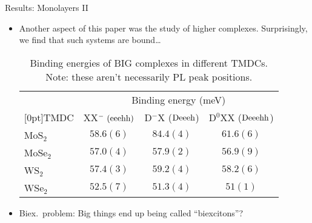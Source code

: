 \documentclass[12pt, pdf, hyperref={draft}, usenames, dvipsnames]{beamer}
\begin{document}
\begin{frame}{Results: Monolayers II}

\begin{itemize}
  \item Another aspect of this paper was the study of higher
  complexes. Surprisingly, we find that such systems are bound\ldots

\begin{table}[H] \caption{Binding energies of BIG complexes in different
TMDCs. Note: these aren't necessarily PL peak positions.
\label{table:big_complexes}} \begin{center} \begin{tabular}{lccc} \hline
\hline

 & \multicolumn{3}{c}{Binding energy (meV)} \\

\raisebox{1.5ex}[0pt]{TMDC} & XX$^-\ (\rm eeehh)$ & D$^-$X ($\rm Deeeh$) & D$^0$XX
($\rm Deeehh$) \\

\hline

MoS$_2$  & $58.6(6)$ & $84.4(4)$ & $61.6(6)$ \\

MoSe$_2$ & $57.0(4)$ & $57.9(2)$ & $56.9(9)$ \\

WS$_2$   & $57.4(3)$ & $59.2(4)$ & $58.2(6)$ \\

WSe$_2$  & $52.5(7)$ & $51.3(4)$ & $51(1)$ \\

\hline \hline
\end{tabular}
\end{center}
\end{table}

\item Biex.\ problem: Big things end up being called ``biexcitons''?

\end{itemize}

\end{frame}

\end{document}
